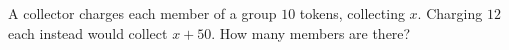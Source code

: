 A collector charges each member of a group $10$ tokens, collecting $x$. Charging $12$ each instead would collect $x+50$. How many members are there?
